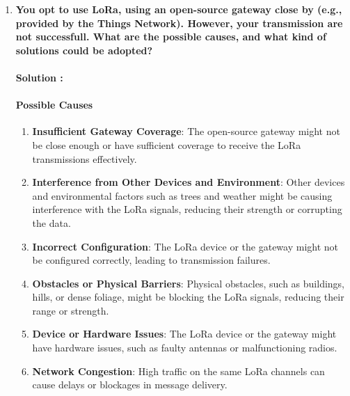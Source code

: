 \documentclass{article}
\begin{document}
\begin{enumerate}
    
    
    \item \textbf{You opt to use LoRa, using an open-source gateway close by (e.g., provided by the Things Network). However, your transmission are not successfull. What are the possible causes, and what kind of solutions could be adopted?}

\paragraph{Solution :}

\paragraph{Possible Causes}
\begin{enumerate}
    \item \textbf{Insufficient Gateway Coverage}: The open-source gateway might not be close enough or have sufficient coverage to receive the LoRa transmissions effectively.
    \item \textbf{Interference from Other Devices and Environment}: Other devices and environmental factors such as trees and weather might be causing interference with the LoRa signals, reducing their strength or corrupting the data.
    \item \textbf{Incorrect Configuration}: The LoRa device or the gateway might not be configured correctly, leading to transmission failures.
    \item \textbf{Obstacles or Physical Barriers}: Physical obstacles, such as buildings, hills, or dense foliage, might be blocking the LoRa signals, reducing their range or strength.
    \item \textbf{Device or Hardware Issues}: The LoRa device or the gateway might have hardware issues, such as faulty antennas or malfunctioning radios.
    \item \textbf{Network Congestion}: High traffic on the same LoRa channels can cause delays or blockages in message delivery.
\end{enumerate}


\end{enumerate}
\end{document}
